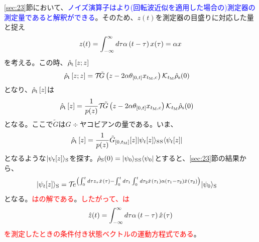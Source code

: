\documentclass[10pt, a4paper]{jsarticle}
\begin{document}
\ref{sec:23}節において、\textcolor{blue}{ノイズ演算子はより(回転波近似を適用した場合の)測定器の測定量であると解釈ができる}。そのため、$z(t)$を測定器の目盛りに対応した量と捉え
\textcolor{red}{
\begin{equation}
\begin{split}
\label{eq:235}
	z(t) = \integ{- \infty}{\infty} d\tau \alpha \left( t - \tau \right) x(\tau) = \alpha x
\end{split}
\end{equation}
}
を考える。この時、$\hrho{t} \left[ z; z \right]$
\textcolor{red}{
\begin{equation}
\begin{split}
\label{eq:236}
	\hrho{t} \left[ z; z \right] &= \sop{T}{} \tilde{G} \left( z - 2 \alpha \theta_{\range{0}{t}} x_{t_{\rm M}, {\rm c}} \right) \sop{K}{t_{\rm M}} \hrho{s}(0)
\end{split}
\end{equation}
}
となり、$\hrho{t} \left[ z \right]$は
\textcolor{red}{
\begin{equation}
\begin{split}
\label{eq:237}
	\hrho{t} \left[ z \right] &= \dfrac{1}{p(z)} \sop{T}{} \tilde{G} \left( z - 2 \alpha \theta_{\range{0}{t}} x_{t_{\rm M}, {\rm c}} \right) \sop{K}{t_{\rm M}} \hrho{s}(0)
\end{split}
\end{equation}
}
となる。ここで$\tilde{G}$は$G \div $ヤコビアンの量である。いま、
\textcolor{red}{
\begin{equation}
\begin{split}
\label{eq:238}
	\hrho{t} \left[ z \right] &= \dfrac{1}{p(z)} \tilde{G}_{\range{0}{t_{\rm M}}}[z] \ket{\psi_{t}[z]}{S} \bra{\psi_{t}[z]}{S}
\end{split}
\end{equation}
}
となるような$\ket{\psi_{t}[z]}{S}$を探す。$\hrho{S}(0) = \ket{\psi_{0}}{S} \bra{\psi_{0}}{S}$とすると、\ref{sec:23}節の結果から、
\textcolor{red}{
\begin{equation}
\begin{split}
\label{eq:239}
	\ket{\psi_{t}[z]}{S} &= \sop{T}{} \e{\left( \integ{0}{t} d\tau z_{\tau} \op{x}{}(\tau) - \integ{0}{t} d\tau_{1} \integ{0}{t} d\tau_{2} \op{x}{}(\tau_{1}) \alpha(\tau_{1} - \tau_{2}) \op{x}{}(\tau_{2}) \right)} \ket{\psi_{0}}{S}
\end{split}
\end{equation}
}
となる。\textcolor{red}{はの解である}。\textcolor{red}{したがって、は
\begin{equation}
\begin{split}
\label{eq:240}
	\op{z}{}(t) = \integ{- \infty}{\infty} d\tau \alpha \left( t - \tau \right) \op{x}{}(\tau)
\end{split}
\end{equation}
を測定したときの条件付き状態ベクトルの運動方程式である}。
\end{document}
